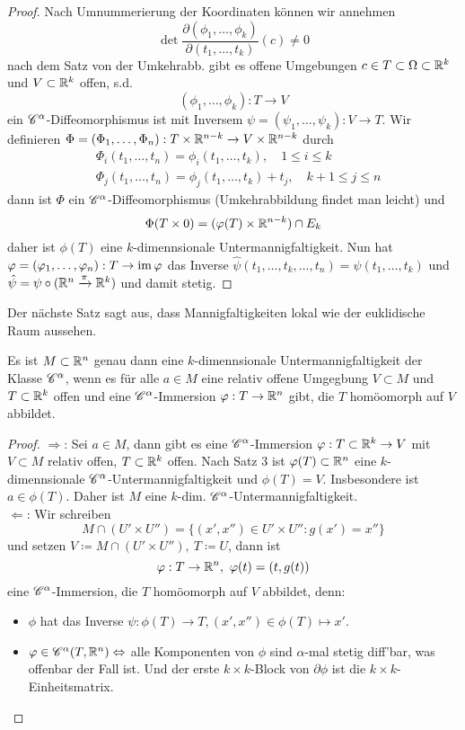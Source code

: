 \begin{proof}
    Nach Umnummerierung der Koordinaten können wir annehmen
    \[
    \det \frac{\partial(\phi_1,\ldots,\phi_k)}{\partial(t_1,\ldots,t_k)}(c)\neq 0    
    \]
    nach dem Satz von der Umkehrabb. gibt es offene Umgebungen $c\in T\subset \Omega \subset \mathbb{R}^k$ und $V\subset \mathbb{R}^k$ offen, s.d. 
    \[
    (\phi_1,\ldots,\phi_k):T\to V
    \]
    ein $\mathscr{C}^\alpha$-Diffeomorphismus ist mit Inversem $\psi=(\psi_1,\ldots,\psi_k):V\to T$. Wir definieren $\Phi=(\Phi_1,\ldots,\Phi_n):T\times \mathbb{R}^{n-k}\to V\times \mathbb{R}^{n-k}$ durch 
    \begin{align*}
        & \Phi_i(t_1,\ldots,t_n) = \phi_i(t_1,\ldots,t_k), \quad 1\le i \le k \\
        & \Phi_j(t_1,\ldots,t_n) = \phi_j(t_1,\ldots,t_k)+t_j, \quad k+1\le j \le n
    \end{align*}
    dann ist $\Phi$ ein $\mathscr{C}^\alpha$-Diffeomorphismus (Umkehrabbildung findet man leicht) und 
    \[
    \Phi(T\times 0) = (\varphi(T)\times \mathbb{R}^{n-k})\cap E_k    
    \]
    daher ist $\phi(T)$ eine $k$-dimennsionale Untermannigfaltigkeit. Nun hat $\varphi=(\varphi_1,\ldots,\varphi_n):T \to \operatorname{im} \varphi$ das Inverse $\hat{\psi}(t_1,\ldots,t_k,\ldots,t_n) = \psi(t_1,\ldots,t_k)$ und $\hat{\psi}=\psi\circ(\mathbb{R}^n\xrightarrow{\pi} \mathbb{R}^k)$ und damit stetig. 
\end{proof}
Der nächste Satz sagt aus, dass Mannigfaltigkeiten lokal wie der euklidische Raum aussehen. 
\begin{satz}
    Es ist $M\subset \mathbb{R}^n$ genau dann eine $k$-dimennsionale Untermannigfaltigkeit der Klasse $\mathscr{C}^\alpha$, wenn es für alle $a\in M$ eine relativ offene Umgegbung 
    $V\subset M$ und $T\subset \mathbb{R}^k$ offen und eine $\mathscr{C}^\alpha$-Immersion $\varphi:T\to \mathbb{R}^n$ gibt, die $T$ homöomorph auf $V$ abbildet.
\end{satz}
\begin{proof}
    \glqq $\Rightarrow$\grqq: Sei $a\in M$, dann gibt es eine $\mathscr{C}^\alpha$-Immersion $\varphi:T\subset \mathbb{R}^k\to V$ mit $V\subset M$ relativ offen, $T\subset \mathbb{R}^k$ offen. 
    Nach Satz 3 ist $\varphi(T)\subset \mathbb{R}^n$ eine $k$-dimennsionale $\mathscr{C}^\alpha$-Untermannigfaltigkeit und $\phi(T)=V$. Insbesondere ist $a\in \phi(T)$. Daher ist $M$ eine $k$-dim. $\mathscr{C}^\alpha$-Untermannigfaltigkeit. 
    \\ \glqq $\Leftarrow$\grqq: Wir schreiben 
    \[
        M \cap (U'\times U'') = \{(x',x'') \in U'\times U'': g(x') = x'' \}    
    \]
    und setzen $V\coloneqq M \cap (U'\times U''), \ T \coloneqq U$, dann ist
    \[
    \phi:T\to \R^n, \ \phi(t)=(t,g(t))    
    \] 
    eine $\mathscr{C}^\alpha$-Immersion, die $T$ homöomorph auf $V$ abbildet, denn: 
    \begin{itemize}
        \item $\phi$ hat das Inverse $\psi:\phi(T)\to T, (x',x'')\in \phi(T)\mapsto x'$. 
        \item $\varphi\in \mathscr{C}^\alpha(T,\mathbb{R}^n)\Leftrightarrow$ alle Komponenten von $\phi$ sind $\alpha$-mal stetig diff'bar, was offenbar der Fall ist. Und der erste $k\times k$-Block von $\partial \phi$ ist die $k\times k$-Einheitsmatrix.  
    \end{itemize}
\end{proof}
